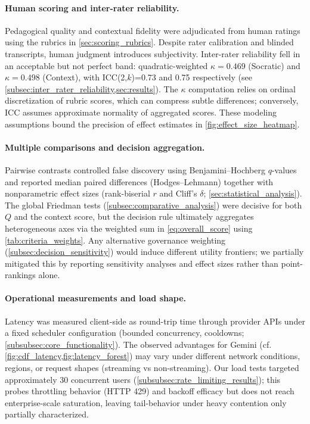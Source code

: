 \paragraph{Human scoring and inter-rater reliability.} Pedagogical quality and contextual fidelity were adjudicated from human ratings using the rubrics in \cref{sec:scoring_rubrics}. Despite rater calibration and blinded transcripts, human judgment introduces subjectivity. Inter-rater reliability fell in an acceptable but not perfect band: quadratic-weighted $\kappa=0.469$ (Socratic) and $\kappa=0.498$ (Context), with ICC(2,$k$)=0.73 and 0.75 respectively (see \cref{subsec:inter_rater_reliability,sec:results}). The $\kappa$ computation relies on ordinal discretization of rubric scores, which can compress subtle differences; conversely, ICC assumes approximate normality of aggregated scores. These modeling assumptions bound the precision of effect estimates in \cref{fig:effect_size_heatmap}.

\paragraph{Multiple comparisons and decision aggregation.} Pairwise contrasts controlled false discovery using Benjamini--Hochberg $q$-values and reported median paired differences (Hodges--Lehmann) together with nonparametric effect sizes (rank-biserial $r$ and Cliff's $\delta$; \cref{sec:statistical_analysis}). The global Friedman tests (\cref{subsec:comparative_analysis}) were decisive for both $Q$ and the context score, but the decision rule ultimately aggregates heterogeneous axes via the weighted sum in \cref{eq:overall_score} using \cref{tab:criteria_weights}. Any alternative governance weighting (\cref{subsec:decision_sensitivity}) would induce different utility frontiers; we partially mitigated this by reporting sensitivity analyses and effect sizes rather than point-rankings alone.

\paragraph{Operational measurements and load shape.} Latency was measured client-side as round-trip time through provider APIs under a fixed scheduler configuration (bounded concurrency, cooldowns; \cref{subsubsec:core_functionality}). The observed advantages for Gemini (cf. \cref{fig:cdf_latency,fig:latency_forest}) may vary under different network conditions, regions, or request shapes (streaming vs non-streaming). Our load tests targeted approximately 30 concurrent users (\cref{subsubsec:rate_limiting_results}); this probes throttling behavior (HTTP 429) and backoff efficacy but does not reach enterprise-scale saturation, leaving tail-behavior under heavy contention only partially characterized.

